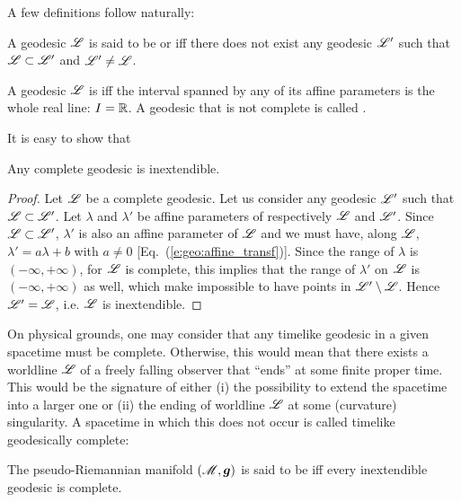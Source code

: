 A few definitions follow naturally:

\begin{greybox}
A geodesic $\mathscr{L}$ is said to be 
or 
iff
there does not exist any geodesic $\mathscr{L}'$ such that  $\mathscr{L}\subset\mathscr{L}'$ and
$\mathscr{L}'\not=\mathscr{L}$.
\end{greybox}

\begin{greybox}
A geodesic $\mathscr{L}$ is 
iff the interval spanned by any of its affine parameters is the whole real line:
$I=\mathbb{R}$. A geodesic that is not complete is called .
\end{greybox}

It is easy to show that
\begin{greybox}
Any complete geodesic is inextendible.
\end{greybox}
\begin{proof}
Let $\mathscr{L}$ be a complete geodesic.
Let us consider any geodesic $\mathscr{L}'$ such that $\mathscr{L}\subset \mathscr{L}'$.
Let $\lambda$ and $\lambda'$ be affine parameters of respectively $\mathscr{L}$
and $\mathscr{L}'$. Since $\mathscr{L}\subset \mathscr{L}'$, $\lambda'$ is also an affine parameter
of $\mathscr{L}$ and we must have, along $\mathscr{L}$,
$\lambda' = a \lambda + b$ with $a\not=0$ [Eq.~(\ref{e:geo:affine_transf})].
Since the range of $\lambda$ is $(-\infty,+\infty)$, for $\mathscr{L}$ is complete,
this implies that the range of $\lambda'$ on $\mathscr{L}$ is $(-\infty,+\infty)$
as well, which make impossible to have points in $\mathscr{L}'\setminus\mathscr{L}$.
Hence $\mathscr{L}'=\mathscr{L}$, i.e. $\mathscr{L}$ is inextendible.
\end{proof}


On physical grounds, one may consider that any timelike geodesic in a given
spacetime must be complete. Otherwise, this would mean that there exists a worldline
$\mathscr{L}$ of a freely falling observer that ``ends'' at some finite proper time. This
would be the signature of either (i) the possibility to extend the spacetime into
a larger one or (ii) the ending of worldline $\mathscr{L}$ at some (curvature)
singularity. A spacetime in which this does not occur
is called timelike geodesically complete:


\begin{greybox}
The pseudo-Riemannian manifold $(\mathscr{M},\bm{g})$ is said to be
iff every inextendible geodesic is complete.
\end{greybox}

